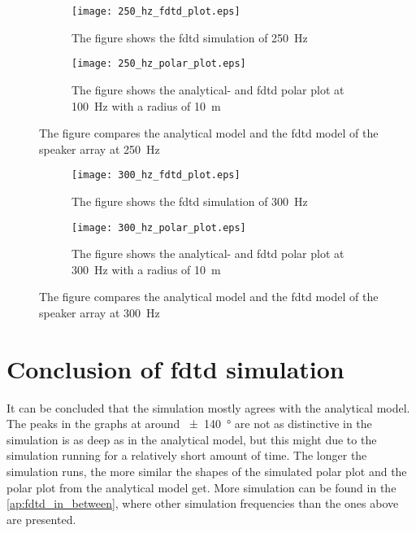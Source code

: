 \begin{figure}[H]
\centering
\begin{subfigure}[htbp]{0.55\textwidth}
		\texttt{[image: 250\_hz\_fdtd\_plot.eps]}
		\caption{The figure shows the \gls{fdtd} simulation of \SI{250}{\hertz}}
		\label{fig:fdtd_250_Hz}
\end{subfigure}
\begin{subfigure}[htbp]{0.35\textwidth}
		\texttt{[image: 250\_hz\_polar\_plot.eps]}
		\caption{The figure shows the analytical- and \gls{fdtd} polar plot at \SI{100}{\hertz} with a radius of \SI{10}{\meter}}
		\label{fig:polar_250_Hz}
\end{subfigure} 
\caption{The figure compares the analytical model and the \gls{fdtd} model of the speaker array at \SI{250}{\hertz}}
\end{figure}


\begin{figure}[H]
\centering
\begin{subfigure}[htbp]{0.55\textwidth}
		\texttt{[image: 300\_hz\_fdtd\_plot.eps]}
		\caption{The figure shows the \gls{fdtd} simulation of \SI{300}{\hertz}}
		\label{fig:fdtd_300_Hz}
\end{subfigure}
\begin{subfigure}[htbp]{0.35\textwidth}
		\texttt{[image: 300\_hz\_polar\_plot.eps]}
		\caption{The figure shows the analytical- and \gls{fdtd} polar plot at \SI{300}{\hertz} with a radius of \SI{10}{\meter}}
		\label{fig:polar_300_Hz}
\end{subfigure} 
\caption{The figure compares the analytical model and the \gls{fdtd} model of the speaker array at \SI{300}{\hertz}}
\end{figure}

\section{Conclusion of \gls{fdtd} simulation}
It can be concluded that the simulation mostly agrees with the analytical model. The peaks in the graphs at around \SI{\pm 140}{\degree} are not as distinctive in the simulation is as deep as in the analytical model, but this might due to the simulation running for a relatively short amount of time. The longer the simulation runs, the more similar the shapes of the simulated polar plot and the polar plot from the analytical model get. More simulation can be found in the \autoref{ap:fdtd_in_between}, where other simulation frequencies than the ones above are presented.


